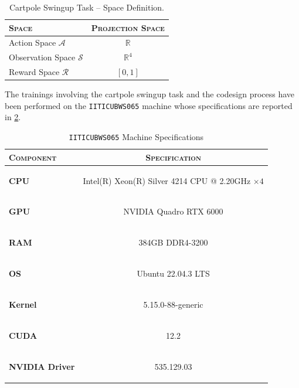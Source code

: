 \begin{table}
    \centering
    \label{tab:cartpoleswinguptaskspacedef}
    \begin{tabular}{l c}
        \toprule
        \textsc{Space}                  & \textsc{Projection Space} \\
        \midrule
        Action Space $\mathcal{A}$      & $\mathbb{R}$              \\
        Observation Space $\mathcal{S}$ & $\mathbb{R} ^{4}$         \\
        Reward Space $\mathcal{R}$      & $[0,1]$                   \\
        \bottomrule
    \end{tabular}
    \caption{Cartpole Swingup Task -- Space Definition.}
\end{table}

The trainings involving the cartpole swingup task and the codesign process have been performed on the \texttt{IITICUBWS065} machine whose specifications are reported in \cref{tab:rl_machine}.

\begin{table}[h]
    \centering
    \caption{\texttt{IITICUBWS065} Machine Specifications}
    \label{tab:rl_machine}
    \begin{tabular}[h]{l c}
        \toprule
        \textsc{Component}     & \textsc{Specification}                                                        \\
        \midrule
        \textbf{CPU}           & \begin{small}Intel(R) Xeon(R) Silver 4214 CPU @ 2.20GHz $\times 4$\end{small} \\
        \textbf{GPU}           & \begin{small}NVIDIA Quadro RTX 6000             \end{small}                   \\
        \textbf{RAM}           & \begin{small}384GB DDR4-3200                         \end{small}              \\
        \textbf{OS}            & \begin{small}Ubuntu 22.04.3 LTS                       \end{small}             \\
        \textbf{Kernel}        & \begin{small}5.15.0-88-generic        \end{small}                             \\
        \textbf{CUDA}          & \begin{small}12.2                                  \end{small}                \\
        \textbf{NVIDIA Driver} & \begin{small}535.129.03                             \end{small}               \\
        \bottomrule
    \end{tabular}
\end{table}

